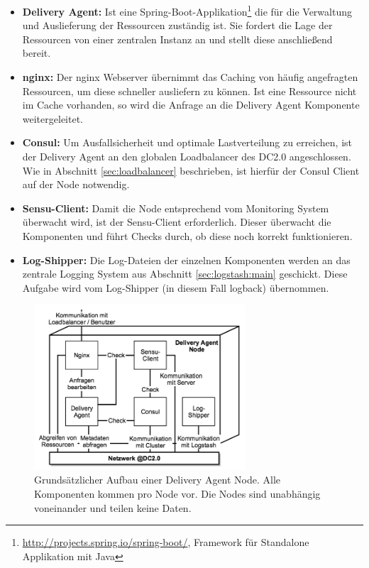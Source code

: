 \begin{itemize}
	\item \textbf{Delivery Agent:} Ist eine Spring-Boot-Applikation\footnote{\url{http://projects.spring.io/spring-boot/}, Framework für Standalone Applikation mit Java} die für die Verwaltung und Auslieferung der Ressourcen zuständig ist. Sie fordert die Lage der Ressourcen von einer zentralen Instanz an und stellt diese anschließend bereit.
	\item \textbf{nginx:} Der nginx Webserver übernimmt das Caching von häufig angefragten Ressourcen, um diese schneller ausliefern zu können. Ist eine Ressource nicht im Cache vorhanden, so wird die Anfrage an die Delivery Agent Komponente weitergeleitet.
	\item \textbf{Consul:} Um Ausfallsicherheit und optimale Lastverteilung zu erreichen, ist der Delivery Agent an den globalen Loadbalancer des DC2.0 angeschlossen. Wie in Abschnitt \ref{sec:loadbalancer} beschrieben, ist hierfür der Consul Client auf der Node notwendig.
	\item \textbf{Sensu-Client:} Damit die Node entsprechend vom Monitoring System überwacht wird, ist der Sensu-Client erforderlich. Dieser überwacht die Komponenten und führt Checks durch, ob diese noch korrekt funktionieren.
	\item \textbf{Log-Shipper:} Die Log-Dateien der einzelnen Komponenten werden an das zentrale Logging System aus Abschnitt \ref{sec:logstash:main} geschickt. Diese Aufgabe wird vom Log-Shipper (in diesem Fall logback) übernommen.
\end{itemize}

\begin{figure}[ht]
	\centering
	\includegraphics[width=0.7\textwidth]{img/deliveryagent_node.png}
	\caption[Aufbau einer Delivery Agent Node]{Grundsätzlicher Aufbau einer Delivery Agent Node. Alle Komponenten kommen pro Node vor. Die Nodes sind unabhängig voneinander und teilen keine Daten.}
	\label{fig:da_node}
\end{figure} 

